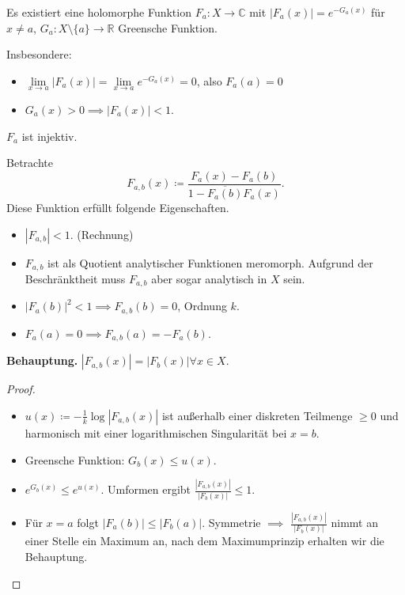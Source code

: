 \documentclass{beamer}
\newcommand{\R}{\mathbb{R}}
\newcommand{\C}{\mathbb{C}}
\begin{document}
    \begin{frame}
        \begin{lemma}
            Es existiert eine holomorphe Funktion $F_a\colon X \to \C$ mit $|F_a(x)| = e^{-G_a(x)}$ für $x \neq a$, $G_a\colon X \setminus \{a\} \to \R$ Greensche Funktion.
        \end{lemma}
        Insbesondere:
        \begin{itemize}
            \item $\lim\limits_{x \to a} |F_a(x)| = \lim\limits_{x \to a} e^{-G_a(x)} = 0$, also $F_a(a) = 0$
            \item $G_a(x) > 0 \implies |F_a(x)| < 1$.
        \end{itemize}
    \end{frame}
    
    \begin{frame}
        \begin{lemma}
            $F_a$ ist injektiv.
        \end{lemma}
        Betrachte $$F_{a,b}(x) \coloneqq \frac{F_a(x) - F_a(b)}{1 - \overline{F_a(b)}F_a(x)}.$$ Diese Funktion erfüllt folgende Eigenschaften.
        \begin{itemize}
            \item $|F_{a,b}| < 1$. (Rechnung)
            \item $F_{a,b}$ ist als Quotient analytischer Funktionen meromorph. Aufgrund der Beschränktheit muss $F_{a,b}$ aber sogar analytisch in $X$ sein.
            \item $|F_a(b)|^2 < 1 \implies F_{a,b}(b) = 0$, Ordnung $k$.
            \item $F_a(a) = 0 \implies F_{a,b}(a) = -F_a(b)$.
        \end{itemize}
    \end{frame}
    \begin{frame}
        \textbf{Behauptung.} $|F_{a,b}(x)| = |F_b(x)| \forall x\in X$.
        \begin{proof}
            \begin{itemize}
                \item $u(x) \coloneqq - \frac{1}{k} \log|F_{a,b}(x)|$ ist außerhalb einer diskreten Teilmenge $\geq 0$ und harmonisch mit einer logarithmischen Singularität bei $x = b$.
                \item Greensche Funktion: $G_b(x) \leq u(x)$.
                \item $e^{G_b(x)} \leq e^{u(x)}$. Umformen ergibt $\frac{|F_{a,b}(x)|}{|F_b(x)|} \leq 1$.
                \item Für $x = a$ folgt $|F_a(b)| \leq |F_b(a)|$. Symmetrie $\implies$ $\frac{|F_{a,b}(x)|}{|F_b(x)|}$ nimmt an einer Stelle ein Maximum an, nach dem Maximumprinzip erhalten wir die Behauptung.
            \end{itemize}
        \end{proof}
    \end{frame}
\end{document}
